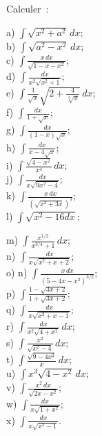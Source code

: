 \documentclass[12pt,french,oneside,a4paper]{memoir} %
\begin{document}
\begin{exo}
Calculer~:\\
\hfill
\begin{minipage}[t]{6cm}
a) $\displaystyle{\int\sqrt{x^2+a^2}\,dx}$;\\[2mm]
b) $\displaystyle{\int \sqrt{a^2-x^2}\,dx}$;\\[2mm]
c) $\displaystyle{\int\frac{x\,dx}{\sqrt{1-x-x^2}}}$;\\[2mm]
d) $\displaystyle{\int\frac{dx}{x^2\sqrt{x^2+1}}}$;\\[2mm]
e) $\displaystyle{\int \frac{1}{\sqrt
x}\sqrt{2+\frac{4}{\sqrt[3]{x}}}\,dx}$;\\[2mm] 
f) $\displaystyle{\int\frac{dx}{1+\sqrt x}}$;\\[2mm] 
g) $\displaystyle{\int \frac{dx}{(1-x)\sqrt x}}$;\\[2mm]
h) $\displaystyle{\int\frac{dx}{x-4\sqrt x}}$;\\[2mm] 
i) $\displaystyle{\int\frac{\sqrt{4-x^2}}{x^4}\,dx};$\\[2mm]
j) $\displaystyle{\int\frac{dx}{x\sqrt{9x^2-4}}};$\\[2mm]
k) $\displaystyle{\int\frac{x\,dx}{(\sqrt{x^2+3x})^3}}$;\\[2mm] 
l) $\displaystyle{\int\sqrt{x^2-16dx}}$;\\[2mm] 
\end{minipage} \hfill 
\begin{minipage}[t]{8cm} 
m) $\displaystyle{\int \frac{x^{1/2}}{x^{3/4}+1}\,dx}$;\\[2mm] 
n) $\displaystyle{\int \frac{dx}{x\sqrt{x^2+x+2}}}$;\\[2mm]
o) n) $\displaystyle{\int \frac{x\,dx}{(5-4x-x^2)^{3/2}}}$;\\[2mm]
p) $\displaystyle{\int \frac{1-\sqrt{3x+2}}{1+\sqrt{3x+2}}}$;\\[2mm]
q) $\displaystyle{\int \frac{dx}{x\sqrt{x^2+x-1}}}$;\\[2mm]
r) $\displaystyle{\int \frac{dx}{x^2\sqrt{4+x^2}}\,dx}$;\\[2mm]
s) $\displaystyle{\int \frac{x^2}{\sqrt{x^2-4}}\,dx}$;\\[2mm]
t) $\displaystyle{\int \frac{\sqrt{9-4x^2}}{x}\,dx}$;\\[2mm]
u) $\displaystyle{\int x^3\sqrt{4-x^2}\,dx}$;\\[2mm]
v) $\displaystyle{\int \frac{x^2\,dx}{\sqrt{2x-x^2}}}$;\\[2mm]
w) $\displaystyle{\int \frac{dx}{x\sqrt{1+x^2}}}$;\\[2mm]
x) $\displaystyle{\int \frac{dx}{x\sqrt{x^2-1}}}$.\\[2mm]
\end{minipage}
\hfill
\end{exo}
\end{document}
